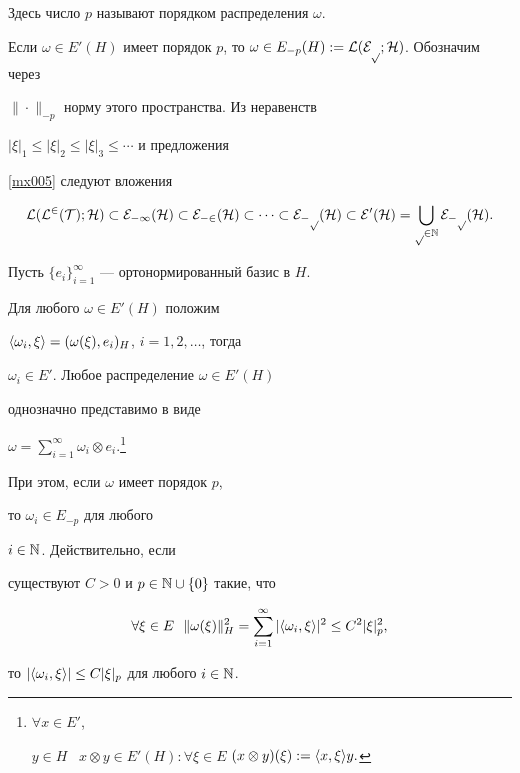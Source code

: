 Здесь число $p$ называют порядком распределения $\omega$.





Если $\omega\in E'(H)$ имеет порядок $p$, то $\omega\in


E_{-p}(H):=\cal{L}(E_p;H)$. Обозначим через


$\|\cdot\|_{-p}$ норму этого пространства. Из неравенств


$|\xi|_1\leq |\xi|_2\leq |\xi|_3\leq\dotsb$ и предложения


\ref{mx005} следуют вложения


$$


\cal{L}(L^2(T);H)\subset E_{-1}(H)\subset


E_{-2}(H)\subset\dotsb \subset E_{-p}(H)\subset


E'(H)=\bigcup\limits_{p\in\Bbb{N}}E_{-p}(H).


$$





Пусть $\{e_i\}_{i=1}^{\infty}$ --- ортонормированный базис в $H$.


Для любого $\omega\in E'(H)$ положим


$\langle \omega_i,\xi\rangle =(\omega(\xi),e_i)_H$, $i=1,2,\dotsc$, тогда


$\omega_i\in E'$. Любое распределение $\omega\in E'(H)$


однозначно представимо в виде


$\omega=\sum\limits_{i=1}^{\infty}


\omega_i\otimes e_i$.\footnote{$\forall x\in E'$,


$y\in H$ \ $x\otimes y\in E'(H): 


\forall \xi\in E$ $(x\otimes y)(\xi):=\la x,\xi\ra y.$}


При этом, если $\omega$ имеет порядок $p$,


то $\omega_i\in E_{-p}$ для любого


$i\in\Bbb{N}$. Действительно, если


существуют $C>0$ и $p\in\Bbb{N}\cup\{0\}$ такие, что


$$


\forall \xi\in E\ \ \|\omega(\xi)\|^2_H=


\sum_{i=1}^{\infty}|\la \omega_i,\xi\ra |^2\leq C^2|\xi|^2_p,


$$


то $|\langle \omega_i,\xi\rangle |\leq C|\xi|_p$ для любого $i\in\Bbb{N}$.





